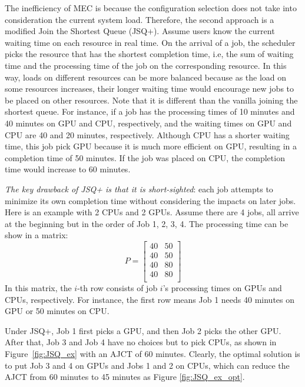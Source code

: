 
The inefficiency of MEC is because the configuration selection does not take into consideration the current system load. Therefore, the second approach is a modified Join the Shortest Queue (JSQ+). 
Assume users know the current waiting time on each resource in real time. On the arrival of a job, the scheduler picks the resource that has the shortest completion time, i.e, the sum of waiting time and the processing time of the job on the corresponding resource. 
In this way, loads on different resources can be more balanced because as the load on some resources increases, their longer waiting time would encourage new jobs to be placed on other resources. 
Note that it is different than the vanilla joining the shortest queue. 
For instance, if a job has the processing times of 10 minutes and 40 minutes on GPU and CPU, respectively, and the waiting times on GPU and CPU are 40 and 20 minutes, respectively.
Although CPU has a shorter waiting time, this job pick GPU because it is much more efficient on GPU, resulting in a completion time of 50 minutes.
If the job was placed on CPU, the completion time would increase to 60 minutes.


\emph{The key drawback of JSQ+ is that it is short-sighted}: each job attempts to minimize its own completion time without considering the impacts on later jobs. 
Here is an example with 2 CPUs and 2 GPUs. Assume there are 4 jobs, all arrive at the beginning but in the order of Job 1, 2, 3, 4. The processing time can be show in a matrix: 
$$
P = \begin{bmatrix}
40 & 50 \\
40 & 50 \\
40 & 80\\
40 & 80\\
\end{bmatrix}
$$
In this matrix, the $i$-th row consists of job $i$'s processing times on GPUs and CPUs, respectively. For instance, the first row means Job 1 needs 40 minutes on GPU or 50 minutes on CPU.

Under JSQ+, Job 1 first picks a GPU, and then Job 2 picks the other GPU.
After that, Job 3 and Job 4 have no choices but to pick CPUs, as shown in Figure~\eqref{fig:JSQ_ex} with an AJCT of 60 minutes.
Clearly, the optimal solution is to put Job 3 and 4 on GPUs and Jobs 1 and 2 on CPUs, which can reduce the AJCT from 60 minutes to 45 minutes as Figure \eqref{fig:JSQ_ex_opt}.

